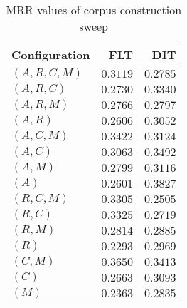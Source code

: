 
\begin{table}
\begin{spacing}{1.2}
\centering
\caption{MRR values of \mahout corpus construction sweep}
\label{table:mahout_corpus_sweep}
\vspace{0.2em}
\begin{tabular}{lrr}
\toprule
Configuration &           FLT &           DIT \\
\midrule
  $(A,R,C,M)$ &      $0.3119$ &      $0.2785$ \\
    $(A,R,C)$ &      $0.2730$ &      $0.3340$ \\
    $(A,R,M)$ &      $0.2766$ &      $0.2797$ \\
      $(A,R)$ &      $0.2606$ &      $0.3052$ \\
    $(A,C,M)$ &      $0.3422$ &      $0.3124$ \\
      $(A,C)$ &      $0.3063$ &      $0.3492$ \\
      $(A,M)$ &      $0.2799$ &      $0.3116$ \\
        $(A)$ &      $0.2601$ & $\bm{0.3827}$ \\
    $(R,C,M)$ &      $0.3305$ &      $0.2505$ \\
      $(R,C)$ &      $0.3325$ &      $0.2719$ \\
      $(R,M)$ &      $0.2814$ &      $0.2885$ \\
        $(R)$ &      $0.2293$ &      $0.2969$ \\
      $(C,M)$ & $\bm{0.3650}$ &      $0.3413$ \\
        $(C)$ &      $0.2663$ &      $0.3093$ \\
        $(M)$ &      $0.2363$ &      $0.2835$ \\
\bottomrule
\end{tabular}

\end{spacing}
\end{table}
